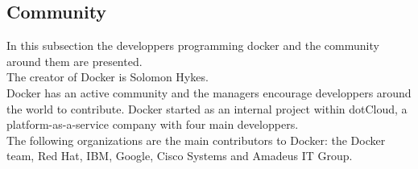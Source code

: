 \subsection{Community}
In this subsection the developpers programming docker and the community around them are presented. \\
The creator of Docker is Solomon Hykes. \\
Docker has an active community and the managers encourage developpers around the world to contribute. 
Docker started as an internal project within dotCloud, a platform-as-a-service company with four main developpers. \\
The following organizations are the main contributors to Docker: the Docker team, Red Hat, IBM, Google, Cisco Systems and Amadeus IT Group. \\

